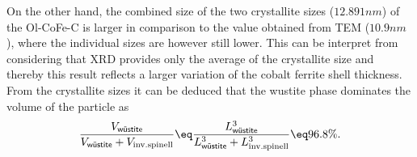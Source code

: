 \documentclass[\main/dresen_thesis.tex]{subfiles}
\begin{document}
    On the other hand, the combined size of the two crystallite sizes ($12.891 \unit{nm}$) of the Ol-CoFe-C is larger in comparison to the value obtained from TEM ($10.9 \unit{nm}$), where the individual sizes are however still lower.
    This can be interpret from considering that XRD provides only the average of the crystallite size and thereby this result reflects a larger variation of the cobalt ferrite shell thickness.
    From the crystallite sizes it can be deduced that the wustite phase dominates the volume of the particle as
    \begin{align}
      \frac{V_{\textsf{w\"ustite}}}{V_{\textsf{w\"ustite}} + V_{\mathrm{inv. spinell}}} \eq \frac{L^3_{\textsf{w\"ustite}}}{ L^3_{\textsf{w\"ustite}} + L^3_{\mathrm{inv. spinell}}} \eq 96.8 \%.
    \end{align}
\end{document}
